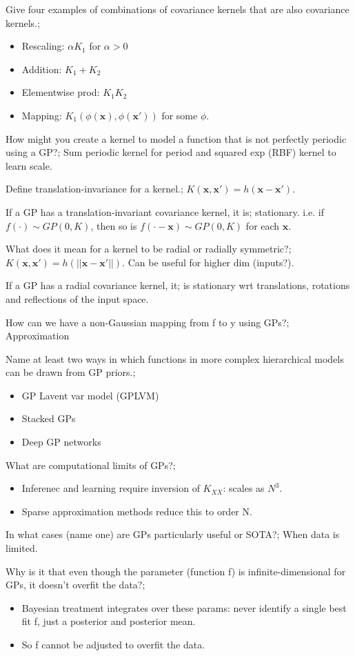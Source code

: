 \documentclass{article}
\begin{document}
Give four examples of combinations of covariance kernels that are also covariance kernels.; \begin{itemize} \item Rescaling: $\alpha K_1$ for $\alpha > 0$ \item Addition: $K_1+K_2$ \item Elementwise prod: $K_1K_2$ \item Mapping: $K_1(\phi(\mathbf{x}), \phi(\mathbf{x'}))$ for some $\phi$.  \end{itemize}

How might you create a kernel to model a function that is not perfectly periodic using a GP?; Sum periodic kernel for period and squared exp (RBF) kernel to learn scale.

Define translation-invariance for a kernel.; $K(\mathbf{x, x'})=h(\mathbf{x-x'})$.

If a GP has a translation-invariant covariance kernel, it is; stationary. i.e. if $f(\cdot)\sim GP(0, K)$, then so is $f(\cdot - \mathbf{x})\sim GP(0, K)$ for each $\mathbf{x}$.

What does it mean for a kernel to be radial or radially symmetric?; $K(\mathbf{x, x'})=h(||\mathbf{x-x'}||)$. Can be useful for higher dim (inputs?).

If a GP has a radial covariance kernel, it; is stationary wrt translations, rotations and reflections of the input space.

How can we have a non-Gaussian mapping from f to y using GPs?; Approximation

Name at least two ways in which functions in more complex hierarchical models can be drawn from GP priors.; \begin{itemize} \item GP Lavent var model (GPLVM) \item Stacked GPs \item Deep GP networks \end{itemize}

What are computational limits of GPs?; \begin{itemize} \item Inferenec and learning require inversion of $K_{XX}$: scales as $N^3$.  \item Sparse approximation methods reduce this to order N.  \end{itemize}

In what cases (name one) are GPs particularly useful or SOTA?; When data is limited.

Why is it that even though the parameter (function f) is infinite-dimensional for GPs, it doesn't overfit the data?; \begin{itemize} \item Bayesian treatment integrates over these params: never identify a single best fit f, just a posterior and posterior mean.  \item So f cannot be adjusted to overfit the data.  \end{itemize}
\end{document}

